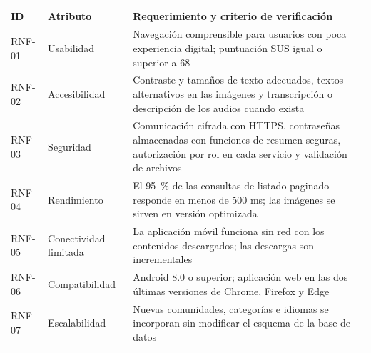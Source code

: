{\centering\singlespacing
  \label{tab:rnf}
  \begin{tabular}{|p{}|p{}|p{}|}
    \hline
    \textbf{ID} & \textbf{Atributo} & \textbf{Requerimiento y criterio de verificación} \tabularnewline
    \hline
    \raggedright\hspace{0pt}RNF-01 & \raggedright\hspace{0pt}Usabilidad & \raggedright\hspace{0pt}Navegación comprensible para usuarios con poca experiencia digital; puntuación SUS igual o superior a 68 \tabularnewline
    \hline
    \raggedright\hspace{0pt}RNF-02 & \raggedright\hspace{0pt}Accesibilidad & \raggedright\hspace{0pt}Contraste y tamaños de texto adecuados, textos alternativos en las imágenes y transcripción o descripción de los audios cuando exista \tabularnewline
    \hline
    \raggedright\hspace{0pt}RNF-03 & \raggedright\hspace{0pt}Seguridad & \raggedright\hspace{0pt}Comunicación cifrada con HTTPS, contraseñas almacenadas con funciones de resumen seguras, autorización por rol en cada servicio y validación de archivos \tabularnewline
    \hline
    \raggedright\hspace{0pt}RNF-04 & \raggedright\hspace{0pt}Rendimiento & \raggedright\hspace{0pt}El 95~\% de las consultas de listado paginado responde en menos de 500 ms; las imágenes se sirven en versión optimizada \tabularnewline
    \hline
    \raggedright\hspace{0pt}RNF-05 & \raggedright\hspace{0pt}Conectividad limitada & \raggedright\hspace{0pt}La aplicación móvil funciona sin red con los contenidos descargados; las descargas son incrementales \tabularnewline
    \hline
    \raggedright\hspace{0pt}RNF-06 & \raggedright\hspace{0pt}Compatibilidad & \raggedright\hspace{0pt}Android 8.0 o superior; aplicación web en las dos últimas versiones de Chrome, Firefox y Edge \tabularnewline
    \hline
    \raggedright\hspace{0pt}RNF-07 & \raggedright\hspace{0pt}Escalabilidad & \raggedright\hspace{0pt}Nuevas comunidades, categorías e idiomas se incorporan sin modificar el esquema de la base de datos \tabularnewline
    \hline
      \end{tabular}\par}

